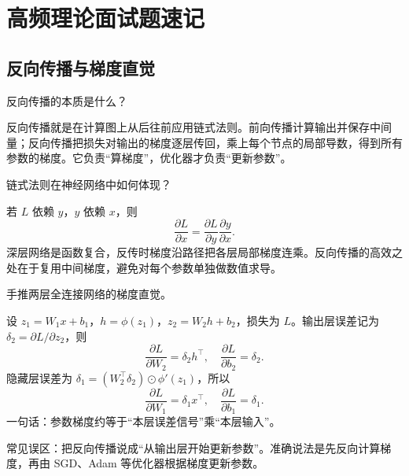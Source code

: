 \chapter{高频理论面试题速记}
\section{反向传播与梯度直觉}
\begin{interview}
反向传播的本质是什么？
\end{interview}
\begin{answer}
反向传播就是在计算图上从后往前应用链式法则。前向传播计算输出并保存中间量；反向传播把损失对输出的梯度逐层传回，乘上每个节点的局部导数，得到所有参数的梯度。它负责“算梯度”，优化器才负责“更新参数”。
\end{answer}
\begin{interview}
链式法则在神经网络中如何体现？
\end{interview}
\begin{answer}
若 $L$ 依赖 $y$，$y$ 依赖 $x$，则
\[
\frac{\partial L}{\partial x}=\frac{\partial L}{\partial y}\frac{\partial y}{\partial x}.
\]
深层网络是函数复合，反传时梯度沿路径把各层局部梯度连乘。反向传播的高效之处在于复用中间梯度，避免对每个参数单独做数值求导。
\end{answer}
\begin{interview}
手推两层全连接网络的梯度直觉。
\end{interview}
\begin{answer}
设 $z_1=W_1x+b_1$，$h=\phi(z_1)$，$z_2=W_2h+b_2$，损失为 $L$。输出层误差记为 $\delta_2=\partial L/\partial z_2$，则
\[
\frac{\partial L}{\partial W_2}=\delta_2h^\top,
\quad
\frac{\partial L}{\partial b_2}=\delta_2.
\]
隐藏层误差为 $\delta_1=(W_2^\top\delta_2)\odot\phi'(z_1)$，所以
\[
\frac{\partial L}{\partial W_1}=\delta_1x^\top,
\quad
\frac{\partial L}{\partial b_1}=\delta_1.
\]
一句话：参数梯度约等于“本层误差信号”乘“本层输入”。
\end{answer}
\begin{trap}
常见误区：把反向传播说成“从输出层开始更新参数”。准确说法是先反向计算梯度，再由 SGD、Adam 等优化器根据梯度更新参数。
\end{trap}
